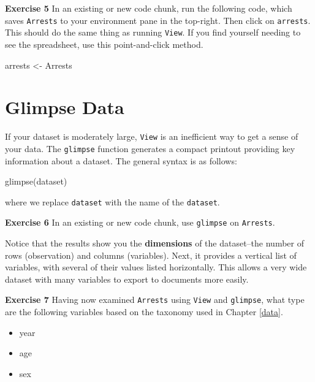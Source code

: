 \documentclass[
]{book}
\makeatletter
\newenvironment{Shaded}{\begin{snugshade}}{\end{snugshade}}
\newcommand{\FunctionTok}[1]{\textcolor[rgb]{0,0,0}{#1}}
\newcommand{\NormalTok}[1]{#1}
\newcommand{\OtherTok}[1]{\textcolor[rgb]{0.37,0.37,0.37}{#1}}
\providecommand{\tightlist}{%
  \setlength{\itemsep}{0pt}\setlength{\parskip}{0pt}}
\newenvironment{kframe}{%
\medskip{}
\setlength{\fboxsep}{.8em}
 \def\at@end@of@kframe{}%
 \ifinner\ifhmode%
  \def\at@end@of@kframe{\end{minipage}}%
  \begin{minipage}{\columnwidth}%
 \fi\fi%
 \def\FrameCommand##1{\hskip\@totalleftmargin \hskip-\fboxsep
 \colorbox{shadecolor}{##1}\hskip-\fboxsep
     \hskip-\linewidth \hskip-\@totalleftmargin \hskip\columnwidth}%
 \MakeFramed {\advance\hsize-\width
   \@totalleftmargin\z@ \linewidth\hsize
   \@setminipage}}%
 {\par\unskip\endMakeFramed%
 \at@end@of@kframe}
\renewenvironment{Shaded}{\begin{kframe}}{\end{kframe}}
\newenvironment{rmdblock}[1]
  {\begin{shaded*}
  }
  {\end{shaded*}
  }
\newenvironment{learncheck}
  {\begin{rmdblock}{warning}}
  {\end{rmdblock}}
\makeatother
\begin{document}
\begin{learncheck}
\textbf{Exercise 5} In an existing or new code chunk, run the following
code, which saves \texttt{Arrests} to your environment pane in the
top-right. Then click on \texttt{arrests}. This should do the same thing
as running \texttt{View}. If you find yourself needing to see the
spreadsheet, use this point-and-click method.
\end{learncheck}

\begin{Shaded}
\begin{Highlighting}[]
\NormalTok{arrests }\OtherTok{\textless{}{-}}\NormalTok{ Arrests}
\end{Highlighting}
\end{Shaded}

\hypertarget{glimpse-data}{%
\section{Glimpse Data}\label{glimpse-data}}

If your dataset is moderately large, \texttt{View} is an inefficient way to get a sense of your data. The \texttt{glimpse} function generates a compact printout providing key information about a dataset. The general syntax is as follows:

\begin{Shaded}
\begin{Highlighting}[]
\FunctionTok{glimpse}\NormalTok{(dataset)}
\end{Highlighting}
\end{Shaded}

where we replace \texttt{dataset} with the name of the \texttt{dataset}.

\begin{learncheck}
\textbf{Exercise 6} In an existing or new code chunk, use
\texttt{glimpse} on \texttt{Arrests}.
\end{learncheck}

Notice that the results show you the \textbf{dimensions} of the dataset--the number of rows (observation) and columns (variables). Next, it provides a vertical list of variables, with several of their values listed horizontally. This allows a very wide dataset with many variables to export to documents more easily.

\begin{learncheck}
\textbf{Exercise 7} Having now examined \texttt{Arrests} using
\texttt{View} and \texttt{glimpse}, what type are the following
variables based on the taxonomy used in Chapter \ref{data}.

\begin{itemize}
\tightlist
\item
  year
\item
  age
\item
  sex
\end{itemize}
\end{learncheck}
\end{document}
